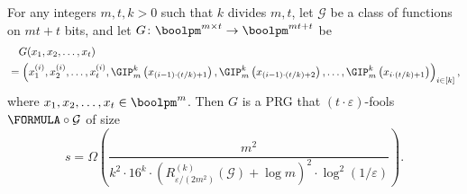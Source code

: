 	\begin{lemma}\label{lem:mild-prg}
	    For any integers $m,t,k>0$ such that $k$ divides $m,t$, let $\mathcal{G}$ be a class of functions on $mt+t$ bits, and let $G\colon\boolpm^{m\times t}\to\boolpm^{mt+t}$ be
		\begin{align*}
			&\quad G(x_1,x_2,\dots,x_t) \\
			&=\left(x_1^{(i)},x_2^{(i)},\dots,x_t^{(i)},\GIP_{m}^{k}\left(x_{(i-1)\cdot(t/k)+1}\right),\GIP_{m}^{k}\left(x_{(i-1)\cdot(t/k)+2}\right),\dots, \GIP_{m}^{k}\left(x_{i\cdot(t/k)+1}\right)\right)_{i\in[k]},
		\end{align*}
		where $x_1,x_2,\dots,x_t\in\boolpm^m$.
		Then $G$ is a PRG that $(t\cdot \varepsilon)$-fools $\FORMULA \circ \mathcal{G}$ of size 
		\[
			s=\Omega\left( \frac{m^2}{k^2\cdot16^{k}\cdot\left(R^{(k)}_{\varepsilon/(2m^2)}(\mathcal{G})+\log m\right)^2\cdot\log^2(1/\varepsilon)}\right).
		\]
	\end{lemma}
	
